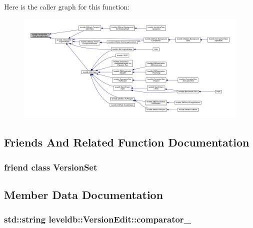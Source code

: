 Here is the caller graph for this function\+:
\nopagebreak
\begin{figure}[H]
\begin{center}
\leavevmode
\includegraphics[width=350pt]{classleveldb_1_1_version_edit_ac1b5689f62e7a8f63c4eefa437a4f2f3_icgraph}
\end{center}
\end{figure}




\subsection{Friends And Related Function Documentation}
\hypertarget{classleveldb_1_1_version_edit_a1827cd1b4d6e9e3c378ce37ca3cce635}{}
\subsubsection[{Version\+Set}]{\setlength{\rightskip}{0pt plus 5cm}friend class {\bf Version\+Set}\hspace{0.3cm}{\ttfamily [friend]}}\label{classleveldb_1_1_version_edit_a1827cd1b4d6e9e3c378ce37ca3cce635}


\subsection{Member Data Documentation}
\hypertarget{classleveldb_1_1_version_edit_abc12f1138eab74643342b6a5de10521c}{}
\subsubsection[{comparator\+\_\+}]{\setlength{\rightskip}{0pt plus 5cm}std\+::string leveldb\+::\+Version\+Edit\+::comparator\+\_\+\hspace{0.3cm}{\ttfamily [private]}}\label{classleveldb_1_1_version_edit_abc12f1138eab74643342b6a5de10521c}
\hypertarget{classleveldb_1_1_version_edit_a2363546c6ba6b79162058c9d8d9980af}{}
